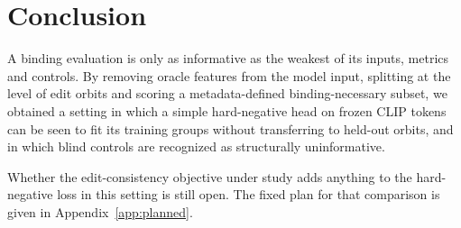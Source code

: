 \section{Conclusion}
\label{sec:conclusion}

A binding evaluation is only as informative as the weakest of its inputs, metrics and controls. By
removing oracle features from the model input, splitting at the level of edit orbits and scoring a
metadata-defined binding-necessary subset, we obtained a setting in which a simple hard-negative
head on frozen CLIP tokens can be seen to fit its training groups without transferring to held-out
orbits, and in which blind controls are recognized as structurally uninformative.
\ifhavepaired

\else
Whether the edit-consistency objective under study adds anything to the hard-negative loss in this
setting is still open. The fixed plan for that comparison is given in Appendix~\ref{app:planned}.
\fi

